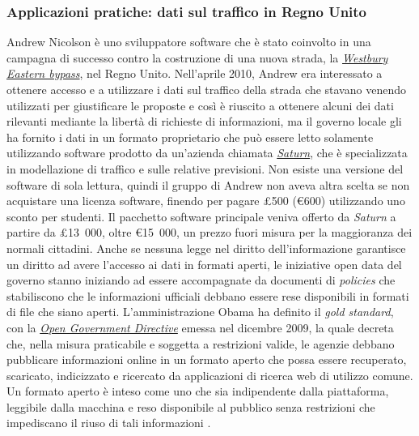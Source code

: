 

\subsubsection{Applicazioni pratiche: dati sul traffico in Regno Unito}
Andrew Nicolson è uno sviluppatore software che è stato coinvolto in una campagna di successo contro la costruzione di una nuova strada, la \textit{\href{https://www.westbury-wilts-bypass.info/inspectors-report-westbury-bypass-scheme.pdf}{Westbury Eastern bypass}}, nel Regno Unito. Nell'aprile 2010, Andrew era interessato a ottenere accesso e a utilizzare i dati sul traffico della strada che stavano venendo utilizzati per giustificare le proposte e così è riuscito a ottenere alcuni dei dati rilevanti mediante la libertà di richieste di informazioni, ma il governo locale gli ha fornito i dati in un formato proprietario che può essere letto solamente utilizzando software prodotto da un'azienda chiamata \textit{\href{https://saturnsoftware2.co.uk/}{Saturn}}, che è specializzata in modellazione di traffico e sulle relative previsioni. Non esiste una versione del software di sola lettura, quindi il gruppo di Andrew non aveva altra scelta se non acquistare una licenza software, finendo per pagare £500 (€600) utilizzando uno sconto per studenti. Il pacchetto software principale veniva offerto da \textit{Saturn} a partire da £13\ 000, oltre €15\ 000, un prezzo fuori misura per la maggioranza dei normali cittadini. Anche se nessuna legge nel diritto dell'informazione garantisce un diritto ad avere l'accesso ai dati in formati aperti, le iniziative open data del governo stanno iniziando ad essere accompagnate da documenti di \textit{policies} che stabiliscono che le informazioni ufficiali debbano essere rese disponibili in formati di file che siano aperti. L'amministrazione Obama ha definito il \textit{gold standard}, con la \textit{\href{https://obamawhitehouse.archives.gov/open/documents/open-government-directive}{Open Government Directive}} emessa nel dicembre 2009, la quale decreta che, nella misura praticabile e soggetta a restrizioni valide, le agenzie debbano pubblicare informazioni online in un formato aperto che possa essere recuperato, scaricato, indicizzato e ricercato da applicazioni di ricerca web di utilizzo comune. Un formato aperto è inteso come uno che sia indipendente dalla piattaforma, leggibile dalla macchina e reso disponibile al pubblico senza restrizioni che impediscano il riuso di tali informazioni \cite{OpenDataHandbook_FileFormats}.



